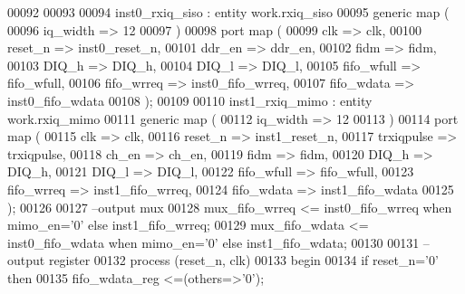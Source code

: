 \begin{DoxyCode}
00092  
00093  
00094  inst0\_rxiq\_siso : \textcolor{keywordflow}{entity} work.rxiq_siso
00095    \textcolor{keywordflow}{generic} \textcolor{keywordflow}{map} (
00096       iq_width    => \textcolor{vhdllogic}{12}
00097    \textcolor{vhdlchar}{)}
00098    \textcolor{keywordflow}{port} \textcolor{keywordflow}{map} (
00099       clk         => clk,
00100       reset_n     => inst0_reset_n,
00101       ddr_en       => ddr_en,
00102       fidm         => fidm,
00103       DIQ_h         => DIQ_h,
00104         DIQ_l          => DIQ_l,
00105       fifo_wfull  => fifo_wfull,
00106       fifo_wrreq  => inst0_fifo_wrreq,
00107       fifo_wdata  => inst0_fifo_wdata
00108         \textcolor{vhdlchar}{)};
00109         
00110  inst1\_rxiq\_mimo : \textcolor{keywordflow}{entity} work.rxiq_mimo
00111    \textcolor{keywordflow}{generic} \textcolor{keywordflow}{map} (
00112       iq_width    => \textcolor{vhdllogic}{12}
00113    \textcolor{vhdlchar}{)}
00114    \textcolor{keywordflow}{port} \textcolor{keywordflow}{map} (
00115       clk         => clk,
00116       reset_n     => inst1_reset_n,
00117         trxiqpulse  => trxiqpulse,
00118       ch_en        => ch_en,
00119       fidm         => fidm,
00120       DIQ_h         => DIQ_h,
00121         DIQ_l          => DIQ_l,
00122       fifo_wfull  => fifo_wfull,
00123       fifo_wrreq  => inst1_fifo_wrreq,
00124       fifo_wdata  => inst1_fifo_wdata
00125         \textcolor{vhdlchar}{)};  
00126       
00127 \textcolor{keyword}{ --output mux}
00128 \textcolor{vhdlchar}{mux_fifo_wrreq} \textcolor{vhdlchar}{<=} \textcolor{vhdlchar}{inst0_fifo_wrreq} \textcolor{keywordflow}{when} \textcolor{vhdlchar}{mimo_en}\textcolor{vhdlchar}{=}\textcolor{vhdlchar}{'}\textcolor{vhdllogic}{}\textcolor{vhdllogic}{0}\textcolor{vhdlchar}{'} \textcolor{keywordflow}{else} \textcolor{vhdlchar}{inst1_fifo_wrreq};
00129 \textcolor{vhdlchar}{mux_fifo_wdata} \textcolor{vhdlchar}{<=} \textcolor{vhdlchar}{inst0_fifo_wdata} \textcolor{keywordflow}{when} \textcolor{vhdlchar}{mimo_en}\textcolor{vhdlchar}{=}\textcolor{vhdlchar}{'}\textcolor{vhdllogic}{}\textcolor{vhdllogic}{0}\textcolor{vhdlchar}{'} \textcolor{keywordflow}{else} \textcolor{vhdlchar}{inst1_fifo_wdata};
00130 
00131 \textcolor{keyword}{--output register}
00132 \textcolor{keywordflow}{process} (reset_n, clk)
00133 \textcolor{vhdlkeyword}{begin }
00134    \textcolor{keywordflow}{if} \textcolor{vhdlchar}{reset_n}\textcolor{vhdlchar}{=}\textcolor{vhdlchar}{'}\textcolor{vhdllogic}{}\textcolor{vhdllogic}{0}\textcolor{vhdlchar}{'} \textcolor{keywordflow}{then}
00135       \textcolor{vhdlchar}{fifo_wdata_reg} \textcolor{vhdlchar}{<=}\textcolor{vhdlchar}{(}\textcolor{keywordflow}{others}\textcolor{vhdlchar}{=}\textcolor{vhdlchar}{>}\textcolor{vhdlchar}{'}\textcolor{vhdllogic}{}\textcolor{vhdllogic}{0}\textcolor{vhdlchar}{'}\textcolor{vhdlchar}{)};

\end{DoxyCode}
